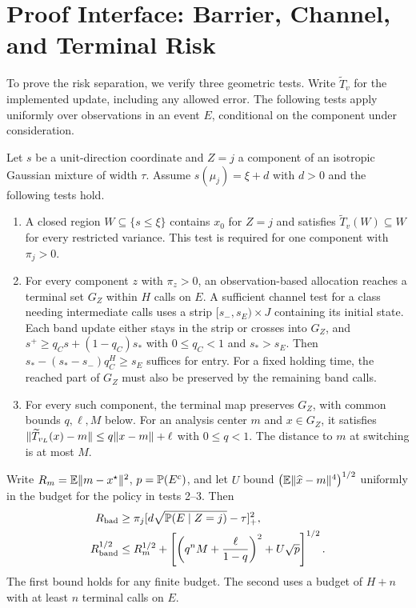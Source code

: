 \section{Proof Interface: Barrier, Channel, and Terminal Risk}
\label{sec:criterion}
To prove the risk separation, we verify three geometric tests.
Write $\widetilde T_v$ for the implemented update, including any
allowed error. The following tests apply uniformly over observations
in an event $E$, conditional on the component under consideration.

\begin{theorem}\label{thm:criterion}
Let $s$ be a unit-direction coordinate and $Z=j$ a component of an
isotropic Gaussian mixture of width $\tau$. Assume
$s(\mu_j)=\xi+d$ with $d>0$ and the following tests hold.
\begin{enumerate}
\item A closed region $W\subseteq\{s\le\xi\}$ contains $x_0$ for
$Z=j$ and satisfies $\widetilde T_v(W)\subseteq W$ for every
restricted variance. This test is required for one component with
$\pi_j>0$.
\item For every component $z$ with $\pi_z>0$, an observation-based allocation reaches a terminal set $G_Z$
within $H$ calls on $E$. A sufficient channel test for a class
needing intermediate calls uses a strip $[s_-,s_E)\times J$
containing its initial state. Each band update either stays in
the strip or crosses into $G_Z$, and
$s^+\ge q_Cs+(1-q_C)s_*$ with $0\le q_C<1$ and $s_*>s_E$.
Then $s_*-(s_*-s_-)q_C^H\ge s_E$ suffices for entry.
For a fixed holding time, the reached part of $G_Z$ must also
be preserved by the remaining band calls.
\item For every such component, the terminal map preserves $G_Z$,
with common bounds $q,\ell,M$ below. For an analysis center $m$
and $x\in G_Z$, it satisfies
$\lVert\widetilde T_{v_L}(x)-m\rVert\le q\lVert x-m\rVert+\ell$ with
$0\le q<1$. The distance to $m$ at switching is at most $M$.
\end{enumerate}
Write $R_m=\mathbb E\lVert m-x^\star\rVert^2$, $p=\mathbb P(E^c)$,
and let $U$ bound $\big(\mathbb E\lVert\widehat x-m\rVert^4\big)^{1/2}$ uniformly
in the budget for the policy in tests 2--3. Then
\begin{align*}
 R_{\rm bad}&\ge\pi_j[d\sqrt{\mathbb P(E\mid Z=j)}-\tau]_+^2,\\
 R_{\rm band}^{1/2}&\le R_m^{1/2}+
 \left[\left(q^n M+\frac{\ell}{1-q}\right)^2+U\sqrt p\right]^{1/2}.
\end{align*}
The first bound holds for any finite budget. The second uses a
budget of $H+n$ with at least $n$ terminal calls on $E$.
\end{theorem}

